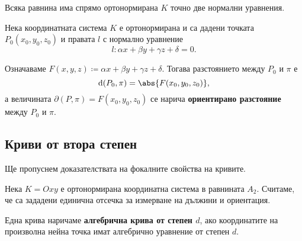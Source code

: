 \documentclass{../../common/topic}
\begin{document}
\begin{proposition}
  Всяка равнина има спрямо ортонормирана \( K \) точно две нормални уравнения.
\end{proposition}

\begin{theorem}
  Нека координатната система \( K \) е ортонормирана и са дадени точката \( P_0(x_0, y_0, z_0) \) и правата \( l \) с нормално уравнение
  \begin{equation*}
    l: \alpha x + \beta y + \gamma z + \delta = 0.
  \end{equation*}

  Означаваме \( F(x, y, z) \coloneqq \alpha x + \beta y + \gamma z + \delta \). Тогава разстоянието между \( P_0 \) и \( \pi \) е
  \begin{equation*}
    \dist(P_0, \pi) = \abs{F(x_0, y_0, z_0)},
  \end{equation*}
  а величината \( \partial(P, \pi) = F(x_0, y_0, z_0) \) се нарича \textbf{ориентирано разстояние} между \( P_0 \) и \( \pi \).
\end{theorem}

\subsection{Криви от втора степен}

\begin{remark}
  Ще пропуснем доказателствата на фокалните свойства на кривите.
\end{remark}

Нека \( K = Oxy \) е ортонормирана координатна система в равнината \( A_2 \). Считаме, че са зададени единична отсечка за измерване на дължини и ориентация.

\begin{definition}
  Една крива наричаме \textbf{алгебрична крива от степен \( d \)}, ако координатите на произволна нейна точка имат алгебрично уравнение от степен \( d \).
\end{definition}
\end{document}
